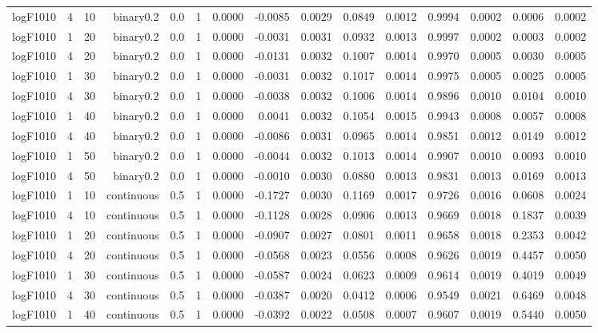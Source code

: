 \begin{longtable}{rrrrrrrrrrrrrrr}
  logF1010 & 4 & 10 & binary0.2 & 0.0 & 1 & 0.0000 & -0.0085 & 0.0029 & 0.0849 & 0.0012 & 0.9994 & 0.0002 & 0.0006 & 0.0002 \\ 
  logF1010 & 1 & 20 & binary0.2 & 0.0 & 1 & 0.0000 & -0.0031 & 0.0031 & 0.0932 & 0.0013 & 0.9997 & 0.0002 & 0.0003 & 0.0002 \\ 
  logF1010 & 4 & 20 & binary0.2 & 0.0 & 1 & 0.0000 & -0.0131 & 0.0032 & 0.1007 & 0.0014 & 0.9970 & 0.0005 & 0.0030 & 0.0005 \\ 
  logF1010 & 1 & 30 & binary0.2 & 0.0 & 1 & 0.0000 & -0.0031 & 0.0032 & 0.1017 & 0.0014 & 0.9975 & 0.0005 & 0.0025 & 0.0005 \\ 
  logF1010 & 4 & 30 & binary0.2 & 0.0 & 1 & 0.0000 & -0.0038 & 0.0032 & 0.1006 & 0.0014 & 0.9896 & 0.0010 & 0.0104 & 0.0010 \\ 
  logF1010 & 1 & 40 & binary0.2 & 0.0 & 1 & 0.0000 & 0.0041 & 0.0032 & 0.1054 & 0.0015 & 0.9943 & 0.0008 & 0.0057 & 0.0008 \\ 
  logF1010 & 4 & 40 & binary0.2 & 0.0 & 1 & 0.0000 & -0.0086 & 0.0031 & 0.0965 & 0.0014 & 0.9851 & 0.0012 & 0.0149 & 0.0012 \\ 
  logF1010 & 1 & 50 & binary0.2 & 0.0 & 1 & 0.0000 & -0.0044 & 0.0032 & 0.1013 & 0.0014 & 0.9907 & 0.0010 & 0.0093 & 0.0010 \\ 
  logF1010 & 4 & 50 & binary0.2 & 0.0 & 1 & 0.0000 & -0.0010 & 0.0030 & 0.0880 & 0.0013 & 0.9831 & 0.0013 & 0.0169 & 0.0013 \\ 
  logF1010 & 1 & 10 & continuous & 0.5 & 1 & 0.0000 & -0.1727 & 0.0030 & 0.1169 & 0.0017 & 0.9726 & 0.0016 & 0.0608 & 0.0024 \\ 
  logF1010 & 4 & 10 & continuous & 0.5 & 1 & 0.0000 & -0.1128 & 0.0028 & 0.0906 & 0.0013 & 0.9669 & 0.0018 & 0.1837 & 0.0039 \\ 
  logF1010 & 1 & 20 & continuous & 0.5 & 1 & 0.0000 & -0.0907 & 0.0027 & 0.0801 & 0.0011 & 0.9658 & 0.0018 & 0.2353 & 0.0042 \\ 
  logF1010 & 4 & 20 & continuous & 0.5 & 1 & 0.0000 & -0.0568 & 0.0023 & 0.0556 & 0.0008 & 0.9626 & 0.0019 & 0.4457 & 0.0050 \\ 
  logF1010 & 1 & 30 & continuous & 0.5 & 1 & 0.0000 & -0.0587 & 0.0024 & 0.0623 & 0.0009 & 0.9614 & 0.0019 & 0.4019 & 0.0049 \\ 
  logF1010 & 4 & 30 & continuous & 0.5 & 1 & 0.0000 & -0.0387 & 0.0020 & 0.0412 & 0.0006 & 0.9549 & 0.0021 & 0.6469 & 0.0048 \\ 
  logF1010 & 1 & 40 & continuous & 0.5 & 1 & 0.0000 & -0.0392 & 0.0022 & 0.0508 & 0.0007 & 0.9607 & 0.0019 & 0.5440 & 0.0050 \\ 

\end{longtable}
